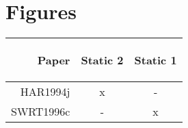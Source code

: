 


\section{Figures}


\begin{tabular}{|r|c|c|}\hline
Paper &\begin{sideways}Static 2\end{sideways} &\begin{sideways}Static 1\end{sideways}\\
\hline
HAR1994j & x & -\\
SWRT1996c & - & x\\
\hline
\end{tabular}




